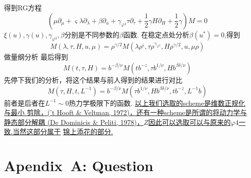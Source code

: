 \documentclass{ctexart}
\begin{document}
得到RG方程
$$\left(\mu\partial_\mu+\varsigma\lambda\partial_{\lambda}+\beta\partial_u+\gamma_{\varphi^2}\tau\partial_{\tau}+\frac{1}{2}\gamma H\partial_H+\frac{1}{2}\gamma\right)M=0$$
$\xi(u),\gamma(u),\gamma_{\varphi^2},\beta$分别是不同参数的$\beta$函数.
在稳定点处分析$\beta(u^*)=0$,得到
$$M(\lambda,\tau, H,u,\mu)=\rho^{\gamma/2}M(\lambda\rho^\varsigma,\tau\rho^{\gamma_{\varphi^2}},H\rho^{\gamma/2},u,\mu\rho)$$
做量纲分析
最后得到
$$M(t,\tau,H)=b^{-\beta/\nu}M(tb^{-z},\tau b^{1/\nu},Hb^{\beta\delta/\nu})$$
先停下我们的分析，将这个结果与前人得到的结果进行对比
$$M(\tau,H,t,L^{-1})=b^{-\beta/\nu}M(\tau b^{1/\nu},Hb^{\beta\delta/\nu},tb^{-z},L^{-1}b)$$
前者是后者在$L^{-1}\sim 0$热力学极限下的函数.
\underline{以上我们选取的scheme是维数正规化与最小 }\newline
\underline{剪除，(’t Hooft \& Veltman, 1972)，还有一种scheme是所谓的将动力学与静态部分解耦 }
\newline\underline{(De Dominicis \& Peliti, 1978)，$Z$因此可以选取可以与原来的$\varphi4$一致.当然这部分属于}
\newline\underline{锦上添花的部分.}
\section{Apendix\ A: Question}
\end{document}
